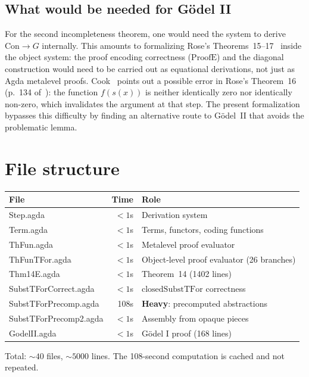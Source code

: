 \documentclass[11pt]{article}
\begin{document}
\subsection*{What would be needed for G\"odel II}

For the second incompleteness theorem, one would need the system
to derive $\mathrm{Con} \to G$ internally.
This amounts to formalizing Rose's Theorems~15--17~\cite{rose1961}
inside the object system:
the proof encoding correctness ($\mathrm{ProofE}$) and the diagonal
construction would need to be carried out as equational derivations,
not just as Agda metalevel proofs.
Cook~\cite{cook1975} points out a possible error in Rose's
Theorem~16 (p.~134 of~\cite{rose1961}): the function $f(s(x))$
is neither identically zero nor identically non-zero, which
invalidates the argument at that step.
The present formalization bypasses this difficulty by finding
an alternative route to G\"odel~II that avoids the problematic
lemma.

\section{File structure}

\begin{center}
\begin{tabular}{lrl}
\hline
\textbf{File} & \textbf{Time} & \textbf{Role} \\
\hline
Step.agda & $<1$s & Derivation system \\
Term.agda & $<1$s & Terms, functors, coding functions \\
ThFun.agda & $<1$s & Metalevel proof evaluator \\
ThFunTFor.agda & $<1$s & Object-level proof evaluator (26 branches) \\
Thm14E.agda & $<1$s & Theorem~14 (1402 lines) \\
SubstTForCorrect.agda & $<1$s & $\mathrm{closedSubstTFor}$ correctness \\
SubstTForPrecomp.agda & 108s & \textbf{Heavy}: precomputed abstractions \\
SubstTForPrecomp2.agda & $<1$s & Assembly from opaque pieces \\
GodelII.agda & $<1$s & G\"odel I proof (168 lines) \\
\hline
\end{tabular}
\end{center}

Total: ${\sim}40$ files, ${\sim}5000$ lines.
The 108-second computation is cached and not repeated.
\end{document}
